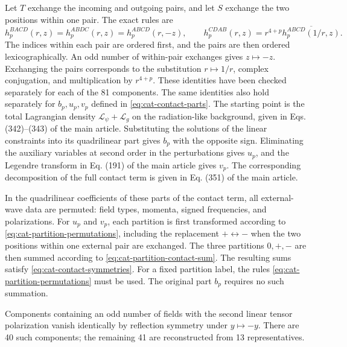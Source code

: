 \documentclass[11pt,a4paper]{article}
\begin{document}
Let $T$ exchange the incoming and outgoing pairs, and let $S$ exchange the two positions within one pair. The exact rules are
\begin{equation}
 h_p^{B A C D}(r,z)=h_p^{A B D C}(r,z)=h_p^{A B C D}(r,-z),\qquad
 h_p^{C D A B}(r,z)=r^{4+p}\overline{h_p^{A B C D}(1/r,z)}.
\label{eq:cat-contact-symmetries}
\end{equation}
The indices within each pair are ordered first, and the pairs are then ordered lexicographically. An odd number of within-pair exchanges gives $z\mapsto-z$. Exchanging the pairs corresponds to the substitution $r\mapsto1/r$, complex conjugation, and multiplication by $r^{4+p}$. These identities have been checked separately for each of the 81 components. The same identities also hold separately for $ b_p,u_p,v_p $ defined in \eqref{eq:cat-contact-parts}. The starting point is the total Lagrangian density $ \mathcal L_\psi+\mathcal L_g $ on the radiation-like background, given in Eqs. (342)--(343) of the main article. Substituting the solutions of the linear constraints into its quadrilinear part gives $ b_p $ with the opposite sign. Eliminating the auxiliary variables at second order in the perturbations gives $ u_p $, and the Legendre transform in Eq. (191) of the main article gives $ v_p $. The corresponding decomposition of the full contact term is given in Eq. (351) of the main article.

In the quadrilinear coefficients of these parts of the contact term, all external-wave data are permuted: field types, momenta, signed frequencies, and polarizations. For $ u_p $ and $ v_p $, each partition is first transformed according to \eqref{eq:cat-partition-permutations}, including the replacement $ +\leftrightarrow- $ when the two positions within one external pair are exchanged. The three partitions $ 0,+,- $ are then summed according to \eqref{eq:cat-partition-contact-sum}. The resulting sums satisfy \eqref{eq:cat-contact-symmetries}. For a fixed partition label, the rules \eqref{eq:cat-partition-permutations} must be used. The original part $ b_p $ requires no such summation.

Components containing an odd number of fields with the second linear tensor polarization vanish identically by reflection symmetry under $y\mapsto-y$. There are 40 such components; the remaining 41 are reconstructed from 13 representatives.
\end{document}
